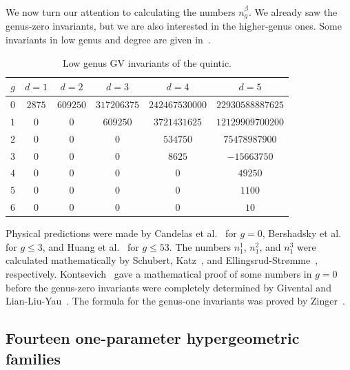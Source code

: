 \documentclass[10pt]{amsart}
\theoremstyle{definition}
\theoremstyle{remark}
\theoremstyle{plain}
\theoremstyle{definition}
\theoremstyle{remark}
\newcommand{\1}{\mathbf{1}}
\newcommand{\2}{\mathbf{2}}
\newcommand{\3}{\mathbf{3}}
\begin{document}
We now turn our attention to calculating the numbers $n_g^{\beta}$. We already saw the genus-zero invariants, but we are also interested in the higher-genus ones. Some invariants in low genus and degree are given in~.
\begin{table}[htpb]
    \centering
    \caption{Low genus GV invariants of the quintic.}
    \label{tab:g0gvquintic}
    \begin{tabular}{cccccc}
        \toprule
        $g$ & $d=1$ & $d=2$ & $d=3$ & $d=4$ & $d=5$ \\
        \midrule
        $0$ & $2875$ & $609250$ & $317206375$ & $242467530000$ & $22930588887625$ \\
        $1$ & $0$ & $0$ & $609250$ & $3721431625$ & $12129909700200$ \\
        $2$ & $0$ & $0$ & $0$ & $534750$ & $75478987900$ \\
        $3$ & $0$ & $0$ & $0$ & $8625$ & $-15663750$ \\
        $4$ & $0$ & $0$ & $0$ & $0$ & $49250$ \\
        $5$ & $0$ & $0$ & $0$ & $0$ & $1100$ \\
        $6$ & $0$ & $0$ & $0$ & $0$ & $10$ \\
        \bottomrule
    \end{tabular}
\end{table}

Physical predictions were made by Candelas et al.~\cite{cdgp} for $g=0$, Bershadsky et al.~\cite{bcov} for $g \leq 3$, and Huang et al.~\cite{hkq} for $g \leq 53$.
The numbers $n_1^1$, $n_1^2$, and $n_1^3$ were calculated mathematically by Schubert, Katz~\cite{katz}, and Ellingsrud-Str{\o}mme~\cite{botteg}, respectively. Kontsevich~\cite{enumtorus} gave a mathematical proof of some numbers in $g=0$ before the genus-zero invariants were completely determined by Givental and Lian-Liu-Yau~\cite{eqgwinv,lly}. The formula for the genus-one invariants was proved by Zinger~\cite{reducedgenus1}.

\subsection{Fourteen one-parameter hypergeometric families}%
\label{sub:Fourteen one-parameter hypergeometric families}
\end{document}
